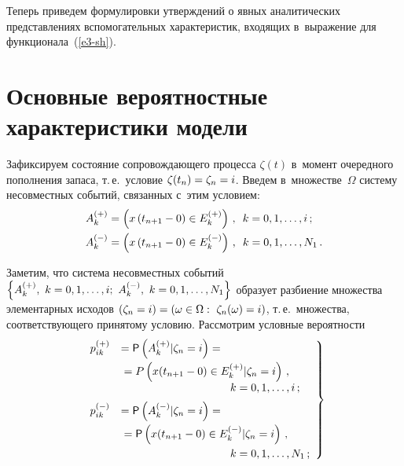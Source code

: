 \begin{multicols}{2}
  Теперь приведем формулировки утверждений о явных аналитических 
представлениях вспомогательных характеристик, входящих в~выражение для 
функционала~(\ref{e3-sh}). 

\section{Основные вероятностные характеристики модели}

  Зафиксируем состояние сопровождающего процесса $\zeta(t)$ в~момент 
очередного пополнения запаса, т.\,е.\ условие $\zeta(t_n)\hm=\zeta_n\hm=i$. 
Введем в~множестве~$\Omega$ систему несовместных событий, связанных 
с~этим условием:
  \begin{align*}
  A_k^{(+)} &= \left( x\left( t_{n+1}-0\right)\in E_k^{(+)}\right)\,,\enskip 
k=0,1,\ldots ,i\,;\\
  A_k^{(-)} &= \left( x\left( t_{n+1}-0\right)\in E_k^{(-)}\right)\,,\enskip 
k=0,1,\ldots , N_1\,.
  \end{align*}
  
  Заметим, что система несовместных событий $\left\{ A_k^{(+)},\ 
k\hm=0,1,\ldots ,i;\ A_k^{(-)},\ k=0,1,\ldots , N_1\right\}$ образует разбиение 
множества элементарных исходов $(\zeta_n\hm=i)\hm= \left( \omega\hm\in 
\Omega:\ \zeta_n(\omega)\hm=i\right)$, т.\,е.\ множества, соответствующего 
принятому условию. Рассмотрим условные вероятности 
  \begin{equation}
  \left.
  \begin{array}{rl}
  p_{ik}^{(+)} &= {\sf P}\left( A_k^{(+)}\vert \zeta_n=i\right) 
  ={}\\[6pt]
  &{}=P\left( x(t_{n+1}-
0) \in E_k^{(+)}\vert \zeta_n=i\right)\,,\\
&  \hspace*{35mm}k=0,1,\ldots , i\,;%
\\[6pt]
  p_{ik}^{(-)} &= {\sf P}\left( A_k^{(-)}\vert \zeta_n=i\right) ={}\\[6pt]
  &{}=
  {\sf P}\left( x(t_{n+1}-0) 
\in E_k^{(-)}\vert \zeta_n=i\right)\,,\\[6pt]
&
  \hspace*{35mm}k=0,1,\ldots , N_1\,;
  \end{array}
  \right\}
  \label{e5-sh}
  \end{equation}
  

\end{multicols}
